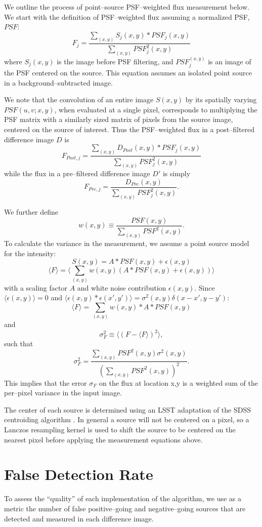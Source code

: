 \documentclass[floatfix, apj]{emulateapj}
\begin{document}
We outline the process of point--source PSF--weighted flux measurement below.
We start with the definition of PSF--weighted flux assuming a normalized PSF, $PSF$:
%
\[F_j = \frac{\sum_{(x,y)}S_j(x,y) * PSF_j(x,y)}{\sum_{(x,y)}PSF_j^2(x,y)}\]
%
where $S_j(x,y)$ is the image before PSF filtering, and $PSF_j^(x,y)$ is an image of the PSF centered on the source.
This equation assumes an isolated point source in a background--subtracted image.

We note that the convolution of an entire image $S(x,y)$ by its spatially varying $PSF(u,v;x,y)$, when evaluated at a single pixel, corresponds to multiplying the PSF matrix with a similarly sized matrix of pixels from the source image, centered on the source of interest.  Thus the PSF--weighted flux in a post--filtered difference image $D$ is 
%
\[F_{Post,j} = \frac{\sum_{(x,y)}D_{Post}(x,y) * PSF_j(x,y)}{\sum_{(x,y)}PSF_j^2(x,y)}\]
while the flux in a pre--filtered difference image $D'$ is simply
\[F_{Pre,j} = \frac{D_{Pre}(x,y)}{\sum_{(x,y)}PSF_j^2(x,y)}.\]

We further define
%
\[w(x,y) \equiv \frac{PSF(x,y)}{\sum_{(x,y)}PSF^2(x,y)}.\]
%
To calculate the variance in the measurement, we assume a point source model for the intensity:
%
\[S(x,y) = A * PSF(x,y) + \epsilon(x,y)\]
\[\langle F \rangle = \langle \sum_{(x,y)} w(x,y)(A * PSF(x,y) +\epsilon(x,y))\rangle\]
%
with a scaling factor $A$ and white noise contribution $\epsilon(x,y)$.
Since $\langle \epsilon(x,y) \rangle = 0$ and $\langle \epsilon(x,y) * \epsilon(x',y') \rangle = \sigma^2(x,y)\delta(x-x', y-y')$:
%
\[\langle F \rangle = \sum_{(x,y)} w(x,y) * A * PSF(x,y)\]
and
\[\sigma^2_F \equiv \langle(F - \langle F \rangle)^2\rangle,\]
such that
\[\sigma^2_F = \frac{\sum_{(x,y)}PSF^2(x,y)\sigma^2(x,y)}{(\sum_{(x,y)} PSF^2(x,y))^2}.\]
This implies that the error $\sigma_{F}$ on the flux at location x,y is a weighted sum of the per--pixel variance in the input image.

The center of each source is determined using an LSST adaptation of the SDSS centroiding algorithm \cite{photo}.
In general a source will not be centered on a pixel, so a Lanczos resampling kernel is used to shift the source to be centered on the nearest pixel before applying the measurement equations above.

\section{False Detection Rate}

To assess the ``quality'' of each implementation of the algorithm, we use as a metric the number of false positive--going and negative--going sources that are detected and measured in each difference image.  
\end{document}
